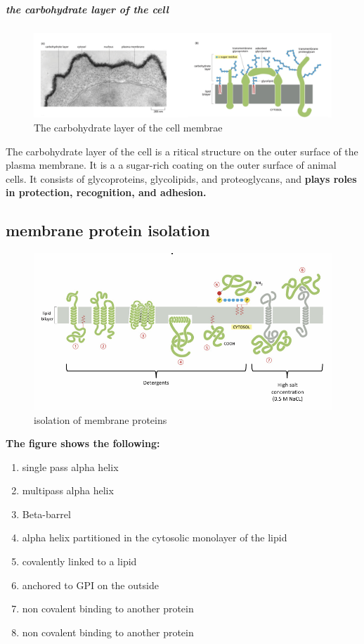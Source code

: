 \documentclass[../main.tex]{subfiles}
\begin{document}
\subparagraph{the carbohydrate layer of the cell}

\begin{figure}[H]
    \centering
    \includegraphics[width=0.5\linewidth]{Carbohydrate_layer.png}
    \caption{The carbohydrate layer of the cell membrae}
    \label{fig:enter-label}
\end{figure}

The carbohydrate layer of the cell is a ritical structure on the outer surface of the plasma membrane. It is a a sugar-rich coating on the outer surface of animal cells.
It consists of glycoproteins, glycolipids, and proteoglycans, and\textbf{ plays roles in protection, recognition, and adhesion.}


\subsection{membrane protein isolation}
\begin{figure}[H]
    \centering
    \includegraphics[width=0.5\linewidth]{MP_isolation.png}
    \caption{isolation of membrane proteins}
    \label{fig:enter-label}
\end{figure}
\textbf{The figure shows the following:}
\begin{enumerate}
    \item single pass alpha helix
    \item multipass alpha helix
    \item Beta-barrel
    \item alpha helix partitioned in the cytosolic monolayer of the lipid
    \item covalently linked to a lipid
    \item anchored to GPI on the outside
    \item non covalent binding to another protein
    \item non covalent binding to another protein
\end{enumerate}
\end{document}

